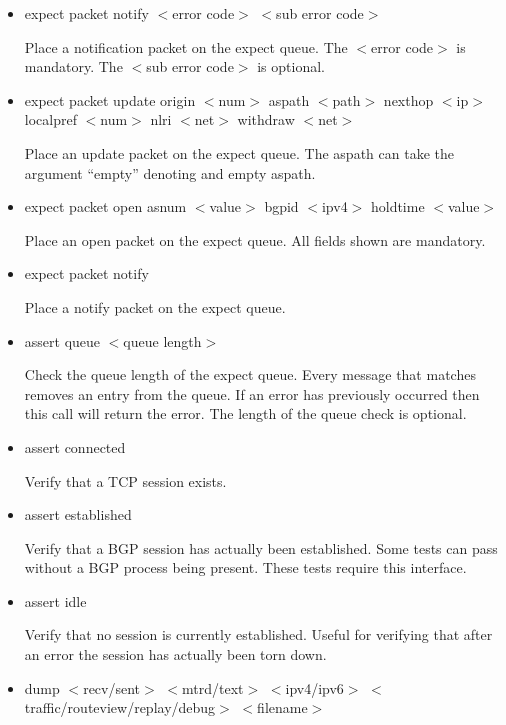 \documentclass[11pt]{article}
\begin{document}
\begin{itemize}
  \item {\sf expect packet notify $<$error code$>$ $<$sub error code$>$}

  Place a notification packet on the expect queue. The $<$error code$>$ is
  mandatory. The $<$sub error code$>$ is optional.
  
  \item {\sf expect packet update 
                    origin $<$num$>$ 
                    aspath $<$path$>$ 
                    nexthop $<$ip$>$ 
                    localpref $<$num$>$
                    nlri $<$net$>$
                    withdraw $<$net$>$}

  Place an update packet on the expect queue. The aspath can take the
  argument ``empty'' denoting and empty aspath.

  \item {\sf expect packet open 
                        asnum $<$value$>$ 
                        bgpid $<$ipv4$>$ 
                        holdtime $<$value$>$}

  Place an open packet on the expect queue. All fields shown are mandatory.

  \item {\sf expect packet notify}

  Place a notify packet on the expect queue.

  \item {\sf assert queue $<$queue length$>$}

  Check the queue length of the expect queue. Every message that
  matches removes an entry from the queue. If an error has previously
  occurred then this call will return the error. The length of the
  queue check is optional.

  \item {\sf assert connected}

  Verify that a TCP session exists.

  \item {\sf assert established}

  Verify that a BGP session has actually been established. Some tests can pass
  without a BGP process being present. These tests require this interface.

  \item {\sf assert idle}

  Verify that no session is currently established. Useful for
  verifying that after an error the session has actually been torn down.

  \item {\sf dump $<$recv/sent$>$ $<$mtrd/text$>$ $<$ipv4/ipv6$>$ $<$traffic/routeview/replay/debug$>$ $<$filename$>$}


\end{itemize}
\end{document}
